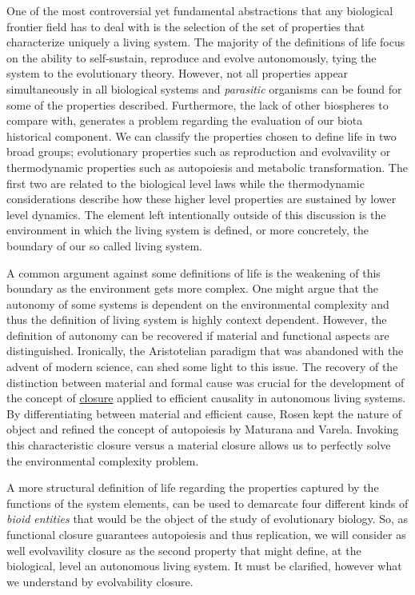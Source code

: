 \documentclass[aps,twocolumn]{revtex4-1}
\begin{document}
One of the most controversial yet fundamental abstractions that any biological frontier field has to deal with is the selection of the set of properties that characterize uniquely a living system. The majority of the definitions of life focus on the ability to self-sustain, reproduce and evolve autonomously, tying the system to the evolutionary theory. However, not all properties appear simultaneously in all biological systems and \textit{parasitic} organisms can be found for some of the properties described. Furthermore, the lack of other biospheres to compare with, generates a problem regarding the evaluation of our biota historical component. We can classify the properties chosen to define life in two broad groups; evolutionary properties such as reproduction and evolvavility or thermodynamic properties such as autopoiesis and metabolic transformation. The first two are related to the biological level laws while the thermodynamic considerations describe how these higher level properties are sustained by lower level dynamics. The element left intentionally outside of this discussion is the environment in which the living system is defined, or more concretely, the boundary of our so called living system. 

A common argument against some definitions of life is the weakening of this boundary as the environment gets more complex. One might argue that the autonomy of some systems is dependent on the environmental complexity and thus the definition of living system is highly context dependent. However, the definition of autonomy can be recovered if material and functional aspects are distinguished. Ironically, the Aristotelian paradigm that was abandoned with the advent of modern science, can shed some light to this issue. The recovery of the distinction between material and formal cause was crucial for the development of the concept of \href{http://en.wikipedia.org/wiki/Closure_(mathematics)}{closure} applied to efficient causality in autonomous living systems. By differentiating between material and efficient cause, Rosen kept the nature of object and refined the concept of autopoiesis by Maturana and Varela. Invoking this characteristic closure versus a material closure allows us to perfectly solve the environmental complexity problem. 

A more structural definition of life regarding the properties captured by the functions of the system elements, can be used to demarcate four different kinds of \textit{bioid entities} that would be the object of the study of evolutionary biology. So, as functional closure guarantees autopoiesis and thus replication, we will consider as well evolvavility closure as the second property that might define, at the biological, level an autonomous living system. It must be clarified, however what we understand by evolvability closure. 
\end{document}
